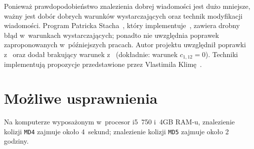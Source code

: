 \documentclass[12pt,a4paper,twoside]{article}
\begin{document}
Ponieważ prawdopodobieństwo znalezienia dobrej wiadomości jest dużo mniejsze,
ważny jest dobór dobrych warunków wystarczających oraz technik modyfikacji
wiadomości. Program Patricka Stacha~\cite{stach2005md5}, który
implementuje~\cite{wang2005md5}, zawiera drobny błąd w~warunkach
wystarczających; ponadto nie uwzględnia poprawek zaproponowanych w~późniejszych
pracach. Autor projektu uwzględnił poprawki
z~\cite{yajima2005wang,sasaki2005improved,liang2007improved} oraz dodał
brakujący warunek z~\cite{wang2005md5} (dokładnie: warunek $c_{1,12} = 0$).
Techniki  implementują propozycje
przedstawione przez Vlastimila Klimę~\cite{klima2005finding2}.

\section{Możliwe usprawnienia}

Na komputerze wyposażonym w~procesor i5~750 i~4GB RAM-u, znalezienie kolizji
\texttt{MD4} zajmuje około 4~sekund; znalezienie kolizji
\texttt{MD5} zajmuje około 2 godziny.

\newpage


\end{document}
